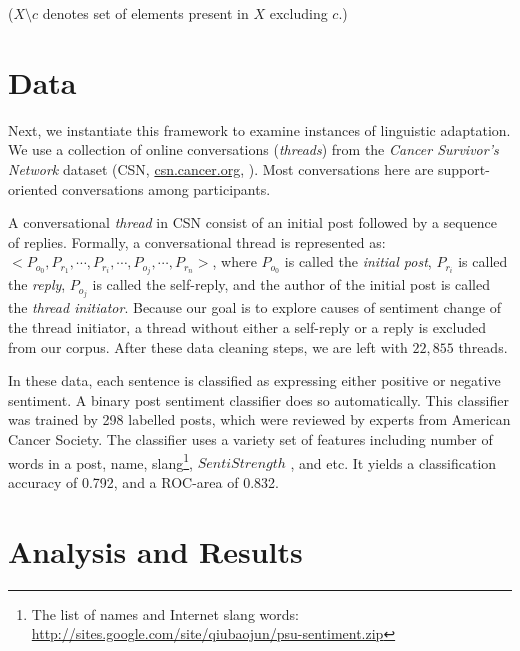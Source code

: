 \documentclass[man,biblatex,floatsintext]{apa6}
\begin{document}
($X\setminus c$ denotes set of elements present in $X$ excluding $c$.)



\section{Data}

Next, we instantiate this framework to examine instances of linguistic adaptation.  We use a collection of online conversations (\emph{threads}) from the \emph{Cancer Survivor's Network} dataset (CSN, \url{csn.cancer.org}, \cite{portier2013understanding}). Most conversations here are support-oriented conversations among participants.%

A conversational \emph{thread} in CSN consist of  an initial post followed by a sequence of replies. Formally, a conversational thread is represented as: $< P_{o_{0}}, P_{r_{1}},\cdots , P_{r_{i}}, \cdots, P_{o_{j}},\cdots ,P_{r_{n}}>$, where $P_{o_{0}}$ is called the \emph{initial post}, $P_{r_{i}}$ is called the \emph{reply}, $P_{o_{j}}$ is called the self-reply, and the author of the initial post is called the \emph{thread initiator}.  Because our goal is to explore causes of sentiment change of the thread initiator, a thread without either a self-reply or a reply is excluded from our corpus. After these data cleaning steps, we are left with $22,855$ threads.

In these data, each sentence is classified as expressing either positive or negative sentiment.  A binary post sentiment classifier  \parencite{qiu2011get} does so automatically. This classifier was trained by 298 labelled posts, which were reviewed by experts from American Cancer Society. The classifier uses a variety set of features including number of words in a post, name, slang\footnote{The list of names and Internet slang words: \url{http://sites.google.com/site/qiubaojun/psu-sentiment.zip}}, $SentiStrength$ \parencite{thelwall2010sentiment}, and etc. It yields a classification accuracy of 0.792, and a ROC-area of 0.832.

\section{Analysis and Results}
\end{document}

